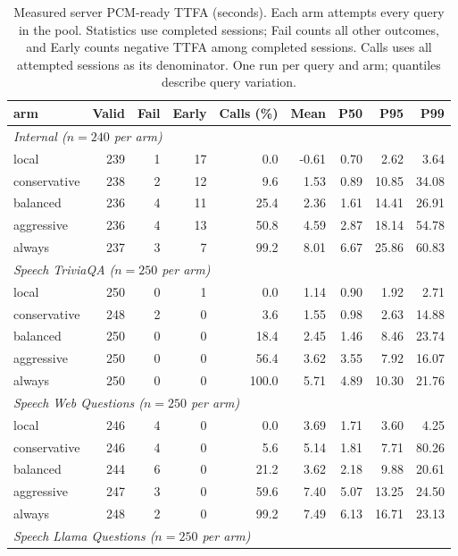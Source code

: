 \begin{table}[!ht]
\centering\small
\caption{Measured server PCM-ready TTFA (seconds). Each arm attempts every query in the pool. Statistics use completed sessions; Fail counts all other outcomes, and Early counts negative TTFA among completed sessions. Calls uses all attempted sessions as its denominator. One run per query and arm; quantiles describe query variation.}
\label{tab:latency}
\setlength{\tabcolsep}{5pt}
\begin{tabular}{lrrrrrrrr}
\toprule
arm & Valid & Fail & Early & Calls (\%) & Mean & P50 & P95 & P99 \\
\midrule
\multicolumn{9}{l}{\textit{Internal ($n=240$ per arm)}} \\
local & 239 & 1 & 17 & 0.0 & -0.61 & 0.70 & 2.62 & 3.64 \\
conservative & 238 & 2 & 12 & 9.6 & 1.53 & 0.89 & 10.85 & 34.08 \\
balanced & 236 & 4 & 11 & 25.4 & 2.36 & 1.61 & 14.41 & 26.91 \\
aggressive & 236 & 4 & 13 & 50.8 & 4.59 & 2.87 & 18.14 & 54.78 \\
always & 237 & 3 & 7 & 99.2 & 8.01 & 6.67 & 25.86 & 60.83 \\
\midrule
\multicolumn{9}{l}{\textit{Speech TriviaQA ($n=250$ per arm)}} \\
local & 250 & 0 & 1 & 0.0 & 1.14 & 0.90 & 1.92 & 2.71 \\
conservative & 248 & 2 & 0 & 3.6 & 1.55 & 0.98 & 2.63 & 14.88 \\
balanced & 250 & 0 & 0 & 18.4 & 2.45 & 1.46 & 8.46 & 23.74 \\
aggressive & 250 & 0 & 0 & 56.4 & 3.62 & 3.55 & 7.92 & 16.07 \\
always & 250 & 0 & 0 & 100.0 & 5.71 & 4.89 & 10.30 & 21.76 \\
\midrule
\multicolumn{9}{l}{\textit{Speech Web Questions ($n=250$ per arm)}} \\
local & 246 & 4 & 0 & 0.0 & 3.69 & 1.71 & 3.60 & 4.25 \\
conservative & 246 & 4 & 0 & 5.6 & 5.14 & 1.81 & 7.71 & 80.26 \\
balanced & 244 & 6 & 0 & 21.2 & 3.62 & 2.18 & 9.88 & 20.61 \\
aggressive & 247 & 3 & 0 & 59.6 & 7.40 & 5.07 & 13.25 & 24.50 \\
always & 248 & 2 & 0 & 99.2 & 7.49 & 6.13 & 16.71 & 23.13 \\
\midrule
\multicolumn{9}{l}{\textit{Speech Llama Questions ($n=250$ per arm)}} \\

\end{tabular}
\end{table}
